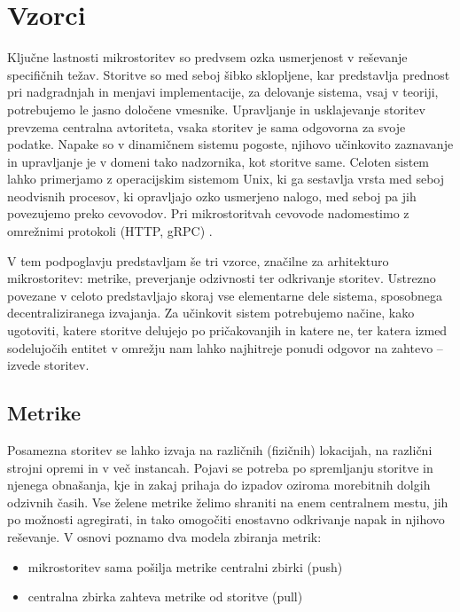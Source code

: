 \documentclass[a4paper, 12pt]{book}
\begin{document}
\section{Vzorci}

Ključne lastnosti mikrostoritev so predvsem ozka usmerjenost v reševanje specifičnih težav.
Storitve so med seboj šibko sklopljene, kar predstavlja prednost pri nadgradnjah in menjavi implementacije, za delovanje sistema, vsaj v teoriji, potrebujemo le jasno določene vmesnike.
Upravljanje in usklajevanje storitev prevzema centralna avtoriteta, vsaka storitev je sama odgovorna za svoje podatke.
Napake so v dinamičnem sistemu pogoste, njihovo učinkovito zaznavanje in upravljanje je v domeni tako nadzornika, kot storitve same.
Celoten sistem lahko primerjamo z operacijskim sistemom Unix, ki ga sestavlja vrsta med seboj neodvisnih procesov, ki opravljajo ozko usmerjeno nalogo, med seboj pa jih povezujemo preko cevovodov.
Pri mikrostoritvah cevovode nadomestimo z omrežnimi protokoli (HTTP, gRPC) \cite{microservicesMartin}.

V tem podpoglavju predstavljam še tri vzorce, značilne za arhitekturo mikrostoritev: metrike, preverjanje odzivnosti ter odkrivanje storitev.
Ustrezno povezane v celoto predstavljajo skoraj vse elementarne dele sistema, sposobnega decentraliziranega izvajanja.
Za učinkovit sistem potrebujemo načine, kako ugotoviti, katere storitve delujejo po pričakovanjih in katere ne, ter katera izmed sodelujočih entitet v omrežju nam lahko najhitreje ponudi odgovor na zahtevo -- izvede storitev.

\subsection{Metrike}

Posamezna storitev se lahko izvaja na različnih (fizičnih) lokacijah, na različni strojni opremi in v več instancah.
Pojavi se potreba po spremljanju storitve in njenega obnašanja, kje in zakaj prihaja do izpadov oziroma morebitnih dolgih odzivnih časih.
Vse želene metrike želimo shraniti na enem centralnem mestu, jih po možnosti agregirati, in tako omogočiti enostavno odkrivanje napak in njihovo reševanje.
V osnovi poznamo dva modela zbiranja metrik: 
\begin{itemize}
	\item mikrostoritev sama pošilja metrike centralni zbirki (push)
	\item centralna zbirka zahteva metrike od storitve (pull)
\end{itemize}
\end{document}
